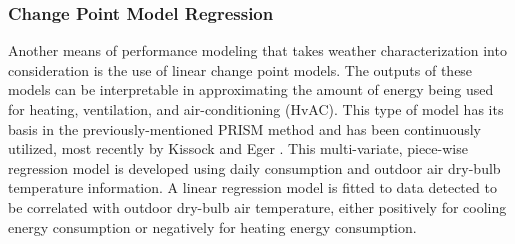 \subsubsection{Change Point Model Regression}
\label{sec:changepointmodels}

Another means of performance modeling that takes weather characterization into consideration is the use of linear change point models. The outputs of these models can be interpretable in approximating the amount of energy being used for heating, ventilation, and air-conditioning (HvAC). This type of model has its basis in the previously-mentioned PRISM method and has been continuously utilized, most recently by Kissock and Eger \cite{Kelly_Kissock_2008}. This multi-variate, piece-wise regression model is developed using daily consumption and outdoor air dry-bulb temperature information. A linear regression model is fitted to data detected to be correlated with outdoor dry-bulb air temperature, either positively for cooling energy consumption or negatively for heating energy consumption.